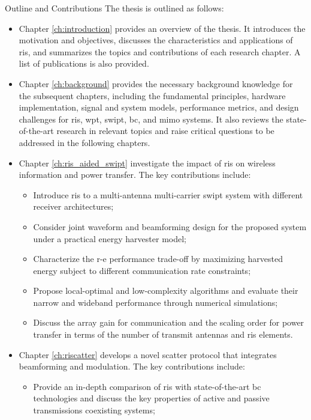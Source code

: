 \begin{section}{Outline and Contributions}
	The thesis is outlined as follows:
	\begin{itemize}
		\item Chapter \ref{ch:introduction} provides an overview of the thesis. It introduces the motivation and objectives, discusses the characteristics and applications of \gls{ris}, and summarizes the topics and contributions of each research chapter. A list of publications is also provided.
		\item Chapter \ref{ch:background} provides the necessary background knowledge for the subsequent chapters, including the fundamental principles, hardware implementation, signal and system models, performance metrics, and design challenges for \gls{ris}, \gls{wpt}, \gls{swipt}, \gls{bc}, and \gls{mimo} systems. It also reviews the state-of-the-art research in relevant topics and raise critical questions to be addressed in the following chapters.
		\item Chapter \ref{ch:ris_aided_swipt} investigate the impact of \gls{ris} on wireless information and power transfer. The key contributions include:
		\begin{itemize}
			\item Introduce \gls{ris} to a multi-antenna multi-carrier \gls{swipt} system with different receiver architectures;
			\item Consider joint waveform and beamforming design for the proposed system under a practical energy harvester model;
			\item Characterize the \gls{r-e} performance trade-off by maximizing harvested energy subject to different communication rate constraints;
			\item Propose local-optimal and low-complexity algorithms and evaluate their narrow and wideband performance through numerical simulations;
			\item Discuss the array gain for communication and the scaling order for power transfer in terms of the number of transmit antennas and \gls{ris} elements.
		\end{itemize}
		\item Chapter \ref{ch:riscatter} develops a novel scatter protocol that integrates beamforming and modulation. The key contributions include:
		\begin{itemize}
			\item Provide an in-depth comparison of \gls{ris} with state-of-the-art \gls{bc} technologies and discuss the key properties of active and passive transmissions coexisting systems;

\end{itemize}
\end{itemize}
\end{section}
